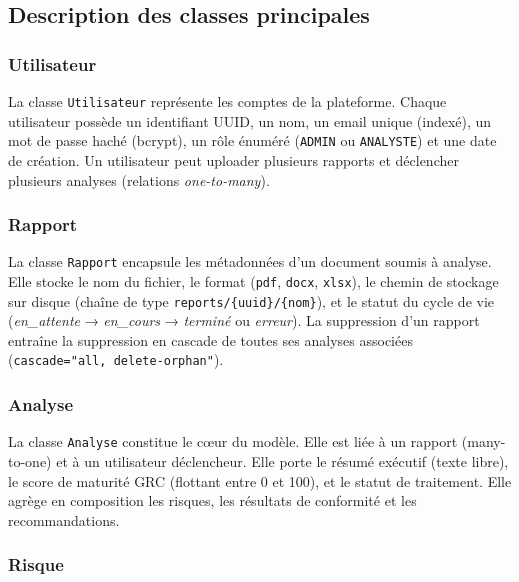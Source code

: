 \documentclass[a4paper,12pt,oneside]{report}
\begin{document}
	\subsection{Description des classes principales}
	
	\subsubsection*{Utilisateur}
	
	La classe \texttt{Utilisateur} représente les comptes de la plateforme.
	Chaque utilisateur possède un identifiant UUID, un nom, un email unique
	(indexé), un mot de passe haché (bcrypt), un rôle énuméré
	(\texttt{ADMIN} ou \texttt{ANALYSTE}) et une date de création.
	Un utilisateur peut uploader plusieurs rapports et déclencher plusieurs
	analyses (relations \textit{one-to-many}).
	
	\subsubsection*{Rapport}
	
	La classe \texttt{Rapport} encapsule les métadonnées d'un document soumis
	à analyse. Elle stocke le nom du fichier, le format (\texttt{pdf},
	\texttt{docx}, \texttt{xlsx}), le chemin de stockage sur disque (chaîne
	de type \texttt{reports/\{uuid\}/\{nom\}}), et le statut du cycle de vie
	(\textit{en\_attente} → \textit{en\_cours} → \textit{terminé} ou
	\textit{erreur}). La suppression d'un rapport entraîne la suppression
	en cascade de toutes ses analyses associées
	(\texttt{cascade="all, delete-orphan"}).
	
	\subsubsection*{Analyse}
	
	La classe \texttt{Analyse} constitue le cœur du modèle. Elle est liée à
	un rapport (many-to-one) et à un utilisateur déclencheur. Elle porte le
	résumé exécutif (texte libre), le score de maturité GRC (flottant entre
	0 et 100), et le statut de traitement. Elle agrège en composition les
	risques, les résultats de conformité et les recommandations.
	
	\subsubsection*{Risque}
	
\end{document}
